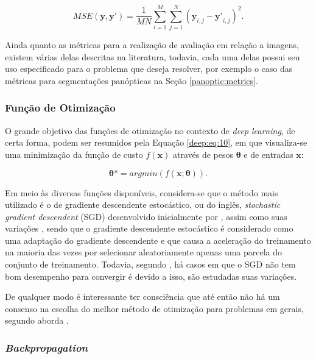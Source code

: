 \begin{equation}
    \label{deep:eq:9}
    MSE(\boldsymbol{y}, \boldsymbol{y'}) = \frac{1}{MN} \sum_{i=1}^{M} \sum_{j=1}^{N} (\boldsymbol{y}_{i,j} - \boldsymbol{y'}_{i,j})^2.
\end{equation}

Ainda quanto as métricas para a realização de avaliação em relação a imagens, existem várias delas descritas na literatura, todavia,  cada uma delas possui seu uso especificado para o problema que deseja resolver, por exemplo o caso das métricas para segmentações panópticas na Seção \ref{panoptic:metrics}.


\subsubsection{Função de Otimização}
\label{deep:optimization}

O grande objetivo das funções de otimização no contexto de \textit{deep learning}, de certa forma, podem ser resumidos pela Equação \ref{deep:eq:10}, em que visualiza-se uma minimização da função de custo $f(\boldsymbol{x})$ através de pesos $\boldsymbol{\theta}$ e de entradas $\boldsymbol{x}$:

\begin{equation}
    \label{deep:eq:10}
    \boldsymbol{\theta}* = argmin(f(\boldsymbol{x};\boldsymbol{\theta})).
\end{equation}

Em meio às diversas funções disponíveis, considera-se que o método mais utilizado é o de gradiente descendente estocástico, ou do inglês, \textit{stochastic gradient descendent} (SGD) desenvolvido inicialmente por \cite{cauchy1847methode}, assim como suas variações \cite{Goodfellow2016}, sendo que o gradiente descendente estocástico é considerado como uma adaptação do gradiente descendente e que causa a aceleração do treinamento na maioria das vezes por selecionar aleatoriamente apenas uma parcela do conjunto de treinamento. Todavia, segundo \cite{Goodfellow2016}, há casos em que o SGD não tem bom desempenho para convergir é devido a isso, são estudadas suas variações.

De qualquer modo é interessante ter consciência que até então não há um consenso na escolha do melhor método de otimização para problemas em gerais, segundo aborda \cite{Goodfellow2016}.

\subsubsection{\textit{Backpropagation}}
\label{deep:backprop}

